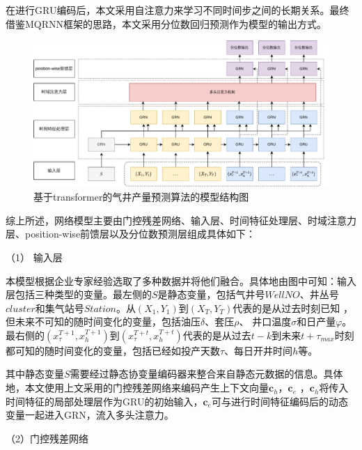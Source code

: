 在进行GRU编码后，本文采用自注意力来学习不同时间步之间的长期关系。最终借鉴MQRNN框架\cite{wen2018multihorizon}的思路，本文采用分位数回归预测作为模型的输出方式。

\begin{figure}[H]
    \centering
    \includegraphics[width=.99\linewidth]{figure/基于Transformer的算法.vision.pdf}
    \caption{基于transformer的气井产量预测算法的模型结构图}
    \label{fig:TFT}
\end{figure}

综上所述，网络模型主要由门控残差网络、输入层、时间特征处理层、时域注意力层、position-wise前馈层以及分位数预测层组成具体如下：

（1） 输入层

本模型根据企业专家经验选取了多种数据并将他们融合。具体地由图中可知：输入层包括三种类型的变量。最左侧的$S$是静态变量，包括气井号$WellNO$、井丛号$cluster$和集气站号$Station$。从$(X_1, Y_1)$到$(X_{T}, Y_{T})$代表的是从过去时刻已知
，但未来不可知的随时间变化的变量，包括油压\( \delta \)、套压\( \rho \)、
井口温度\( \sigma \)和日产量$\varphi $。最右侧的$(x^{T+1}_{\tau }, x^{T+1}_{h })$到$(x^{T+t}_{\tau }, x^{T+t}_{h})$代表的是从过去$t-k$到未来$t+\tau_{max}$时刻
都可知的随时间变化的变量，包括已经如投产天数\( \tau \)、每日开井时间$h$等。

其中静态变量$S$需要经过静态协变量编码器来整合来自静态元数据的信息。具体地，本文使用上文采用的门控残差网络来编码产生上下文向量$\mathbf{c}_h$，$\mathbf{c}_e$
，$\mathbf{c}_h$将传入时间特征的局部处理层作为GRU的初始输入，$\mathbf{c}_e$可与进行时间特征编码后的动态变量一起进入GRN，流入多头注意力。

（2）门控残差网络

